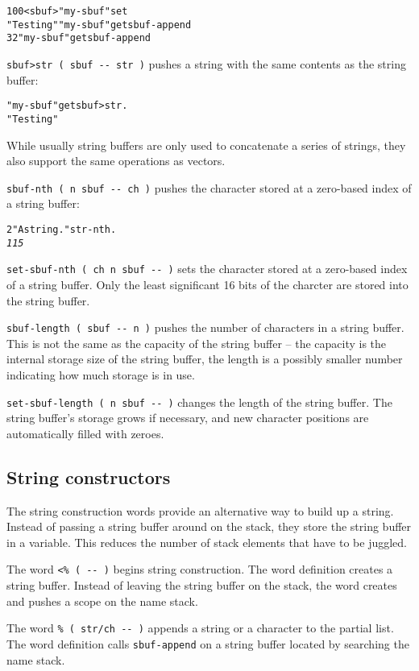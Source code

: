 \documentclass[english]{article}
\begin{document}
\begin{alltt}
100 <sbuf> "my-sbuf" set
"Testing" "my-sbuf" get sbuf-append
32 "my-sbuf" get sbuf-append
\end{alltt}
\texttt{sbuf>str ( sbuf -{}- str )} pushes a string with the same
contents as the string buffer:

\begin{alltt}
"my-sbuf" get sbuf>str .
"Testing "
\end{alltt}
While usually string buffers are only used to concatenate a series
of strings, they also support the same operations as vectors.

\texttt{sbuf-nth ( n sbuf -{}- ch )} pushes the character stored at
a zero-based index of a string buffer:

\begin{alltt}
2 "A string." str-nth .
\emph{115}
\end{alltt}
\texttt{set-sbuf-nth ( ch n sbuf -{}- )} sets the character stored
at a zero-based index of a string buffer. Only the least significant
16 bits of the charcter are stored into the string buffer.

\texttt{sbuf-length ( sbuf -{}- n )} pushes the number of characters
in a string buffer. This is not the same as the capacity of the string
buffer -- the capacity is the internal storage size of the string
buffer, the length is a possibly smaller number indicating how much
storage is in use.

\texttt{set-sbuf-length ( n sbuf -{}- )} changes the length of the
string buffer. The string buffer's storage grows if necessary, and
new character positions are automatically filled with zeroes.


\subsection{String constructors}

The string construction words provide an alternative way to build up a string. Instead of passing a string buffer around on the stack, they store the string buffer in a variable. This reduces the number
of stack elements that have to be juggled.

The word \texttt{<\% ( -{}- )} begins string construction. The word
definition creates a string buffer. Instead of leaving the string
buffer on the stack, the word creates and pushes a scope on the name
stack.

The word \texttt{\% ( str/ch -{}- )} appends a string or a character
to the partial list. The word definition calls \texttt{sbuf-append}
on a string buffer located by searching the name stack.
\end{document}
